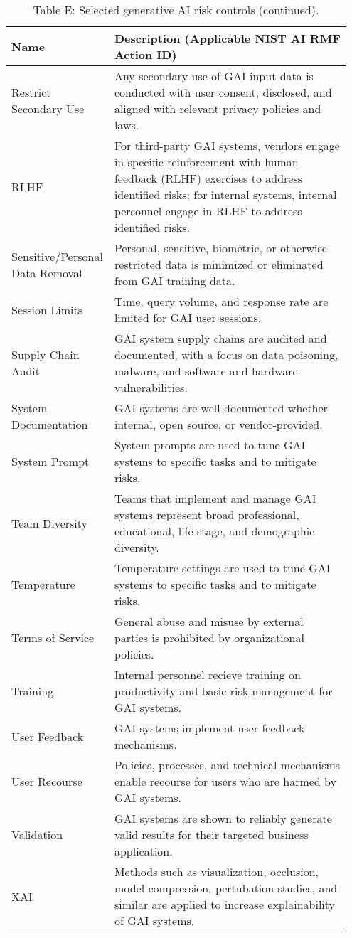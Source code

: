 \documentclass[fleqn]{article}
\begin{document}
\begin{table}[H]
	\caption*{Table E: Selected generative AI risk controls (continued).}
	\label{tab:controls_cont2}
	\footnotesize
	\begin{tabular}{|m{0.25\linewidth} |m{0.70\linewidth} |}
		\hline
		\textbf{Name} & \textbf{Description} (Applicable NIST AI RMF Action ID)\\
		\hline	
		Restrict Secondary Use & Any secondary use of GAI input data is conducted with user consent, disclosed, and aligned with relevant privacy policies and laws. \\ 
		\hline	
		RLHF & For third-party GAI systems, vendors engage in specific reinforcement with human feedback (RLHF) exercises to address identified risks; for internal systems, internal personnel engage in RLHF to address identified risks.   \\ 
		\hline
		Sensitive/Personal Data Removal & Personal, sensitive, biometric, or otherwise restricted data is minimized or eliminated from GAI training data.  \\ 
		\hline
		Session Limits & Time, query volume, and response rate are limited for GAI user sessions. \\ 
		\hline
		Supply Chain Audit & GAI system supply chains are audited and documented, with a focus on data poisoning, malware, and software and hardware vulnerabilities.   \\ 
		\hline
		System Documentation & GAI systems are well-documented whether internal, open source, or vendor-provided.  \\ 
		\hline
		System Prompt  & System prompts are used to tune GAI systems to specific tasks and to mitigate risks.  \\ 
		\hline
		Team Diversity & Teams that implement and manage GAI systems represent broad professional, educational, life-stage, and demographic diversity.  \\ 
		\hline
		Temperature & Temperature settings are used to tune GAI systems to specific tasks and to mitigate risks.  \\ 
		\hline
		Terms of Service & General abuse and misuse by external parties is prohibited by organizational policies.  \\ 
		\hline
		Training  & Internal personnel recieve training on productivity and basic risk management for GAI systems.  \\ 
		\hline
		User Feedback & GAI systems implement user feedback mechanisms.   \\ 
		\hline
		User Recourse & Policies, processes, and technical mechanisms enable recourse for users who are harmed by GAI systems.  \\ 
		\hline
		Validation & GAI systems are shown to reliably generate valid results for their targeted business application. \\ 
		\hline
		XAI & Methods such as visualization, occlusion, model compression, pertubation studies, and similar are applied to increase explainability of GAI systems.  \\ 
		\hline
	\end{tabular}
\end{table}
\end{document}
